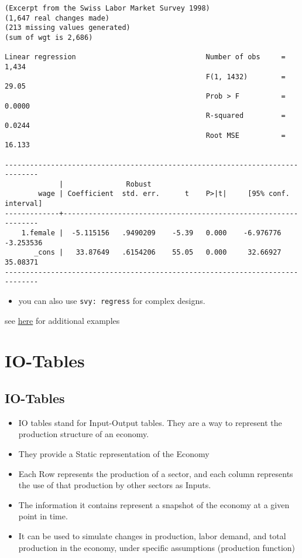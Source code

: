 \documentclass[
  letterpaper,
  DIV=11,
  numbers=noendperiod]{scrartcl}
\providecommand{\tightlist}{%
  \setlength{\itemsep}{0pt}\setlength{\parskip}{0pt}}\usepackage{longtable,booktabs,array}
\begin{document}
\begin{verbatim}
(Excerpt from the Swiss Labor Market Survey 1998)
(1,647 real changes made)
(213 missing values generated)
(sum of wgt is 2,686)

Linear regression                               Number of obs     =      1,434
                                                F(1, 1432)        =      29.05
                                                Prob > F          =     0.0000
                                                R-squared         =     0.0244
                                                Root MSE          =     16.133

------------------------------------------------------------------------------
             |               Robust
        wage | Coefficient  std. err.      t    P>|t|     [95% conf. interval]
-------------+----------------------------------------------------------------
    1.female |  -5.115156   .9490209    -5.39   0.000    -6.976776   -3.253536
       _cons |   33.87649   .6154206    55.05   0.000     32.66927    35.08371
------------------------------------------------------------------------------
\end{verbatim}

\begin{itemize}
\tightlist
\item
  you can also use \texttt{svy:\ regress} for complex designs.
\end{itemize}

see
\href{https://stats.oarc.ucla.edu/stata/faq/how-can-i-do-a-t-test-with-survey-data/}{here}
for additional examples

\section{IO-Tables}\label{io-tables}

\subsection{IO-Tables}\label{io-tables-1}

\begin{itemize}
\item
  IO tables stand for Input-Output tables. They are a way to represent
  the production structure of an economy.
\item
  They provide a Static representation of the Economy
\item
  Each Row represents the production of a sector, and each column
  represents the use of that production by other sectors as Inputs.
\item
  The information it contains represent a snapshot of the economy at a
  given point in time.
\item
  It can be used to simulate changes in production, labor demand, and
  total production in the economy, under specific assumptions
  (production function)
\end{itemize}
\end{document}
